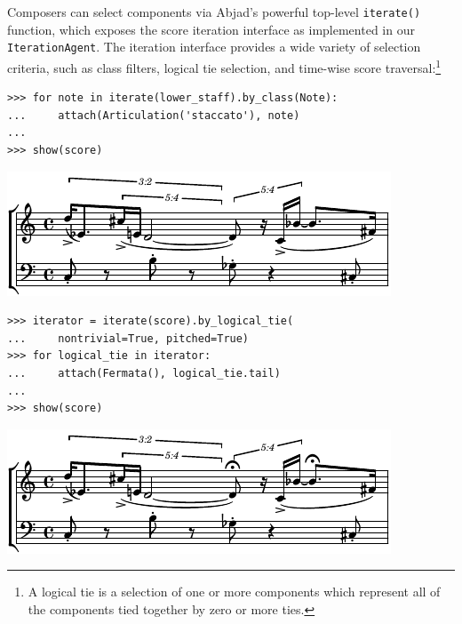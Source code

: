 \documentclass{article}
\begin{document}
Composers can select components via Abjad's powerful top-level
\texttt{iterate()} function, which exposes the score iteration interface as
implemented in our \texttt{IterationAgent}. The iteration interface provides a
wide variety of selection criteria, such as class filters, logical tie
selection, and time-wise score traversal:\footnote{A logical tie is a selection
of one or more components which represent all of the components tied together
by zero or more ties.}

\begin{lstlisting}
>>> for note in iterate(lower_staff).by_class(Note):
...     attach(Articulation('staccato'), note)
...
>>> show(score)
\end{lstlisting}
\includegraphics{assets/lilypond-1aa26e8361e9c7841287eeed734f1cb9.pdf}

\begin{lstlisting}
>>> iterator = iterate(score).by_logical_tie(
...     nontrivial=True, pitched=True)
>>> for logical_tie in iterator:
...     attach(Fermata(), logical_tie.tail)
...
>>> show(score)
\end{lstlisting}
\includegraphics{assets/lilypond-fff28391092702cdbeee1a1a28ff395d.pdf}
\end{document}

